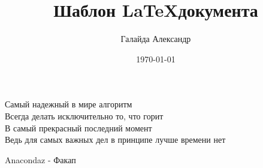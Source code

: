 \documentclass[a4paper,10pt]{article}
\title{Шаблон \LaTeX документа}
\author{Галайда Александр}
\date{\today}
\begin{document}
\maketitle
\epigraph{Самый надежный в мире алгоритм \\
	Всегда делать исключительно то, что горит \\
	В самый прекрасный последний момент \\
	Ведь для самых важных дел в принципе лучше времени нет}{Anacondaz - Факап}
\tableofcontents

\printbibliography
\end{document}
